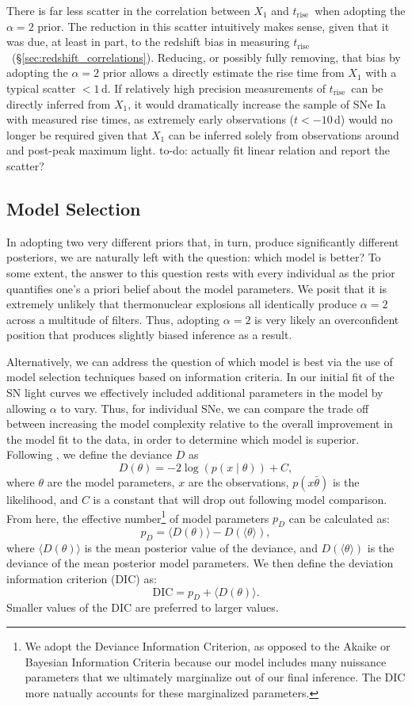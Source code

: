 \documentclass[twocolumn]{./aastex63}
\newcommand{\todo}[1]{{\color{magenta} to-do: {#1}}}
\newcommand{\trise}{$t_\mathrm{rise}$}
\begin{document}
There is far less scatter in the correlation between $X_1$ and \trise\ when
adopting the $\alpha = 2$ prior. The reduction in this scatter intuitively makes
sense, given that it was due, at least in part, to the redshift bias in
measuring \trise\ (\S\ref{sec:redshift_correlations}). Reducing, or possibly
fully removing, that bias by adopting the $\alpha = 2$ prior allows a directly
estimate the rise time from $X_1$ with a typical scatter $< 1$\,d. If relatively
high precision measurements of \trise\ can be directly inferred from $X_1$, it
would dramatically increase the sample of SNe Ia with measured rise times, as
extremely early observations ($t < -10$\,d) would no longer be required given
that $X_1$ can be inferred solely from observations around and post-peak maximum
light. \todo{actually fit linear relation and report the scatter?}

\subsection{Model Selection}

In adopting two very different priors that, in turn, produce significantly
different posteriors, we are naturally left with the question: which model is
better? To some extent, the answer to this question rests with every individual
as the prior quantifies one's a priori belief about the model parameters. We
posit that it is extremely unlikely that thermonuclear explosions all
identically produce $\alpha = 2$ across a multitude of filters. Thus, adopting
$\alpha = 2$ is very likely an overconfident position that produces slightly
biased inference as a result.

Alternatively, we can address the question of which model is best via the use of
model selection techniques based on information criteria. In our initial fit of
the SN light curves we effectively included additional parameters in the model
by allowing $\alpha$ to vary. Thus, for individual SNe, we can compare the trade
off between increasing the model complexity relative to the overall improvement
in the model fit to the data, in order to determine which model is superior.
Following \citet{Spiegelhalter02}, we define the deviance $D$ as
%
$$D(\theta) = -2 \log (p(x\mid \theta)) + C,$$
%
where $\theta$ are the model parameters, $x$ are the observations, $p(x\bar
\theta)$ is the likelihood, and $C$ is a constant that will drop out following
model comparison. From here, the effective number\footnote{We adopt the Deviance
Information Criterion, as opposed to the Akaike or Bayesian Information Criteria
because our model includes many nuissance parameters that we ultimately
marginalize out of our final inference. The DIC more natually accounts for these
marginalized parameters.} of model parameters $p_D$ can be calculated as:
%
$$p_D = \langle D(\theta) \rangle - D(\langle \theta \rangle),$$
%
where $\langle D(\theta) \rangle$ is the mean posterior value of the deviance,
and $D(\langle \theta \rangle)$ is the deviance of the mean posterior model
parameters. We then define the deviation information criterion (DIC) as:
%
$$\mathrm{DIC} = p_D + \langle D(\theta) \rangle.$$
Smaller values of  the DIC are  preferred to larger values.
\end{document}
